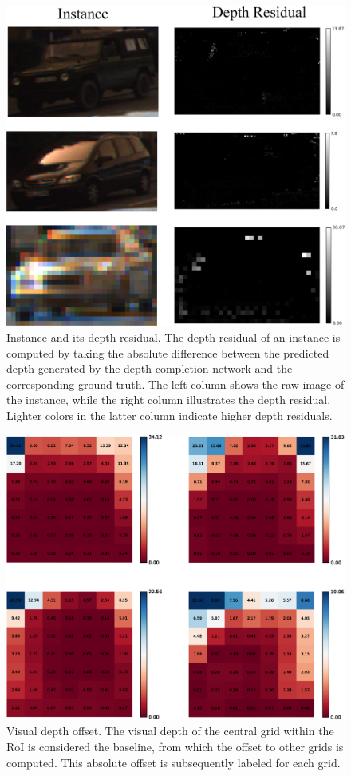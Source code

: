 \documentclass[journal]{IEEEtran}
\begin{document}
	\begin{figure}[!t]
	\centering
	\includegraphics[width=1.0\linewidth]{Figures/depth_residual}
	\caption{Instance and its depth residual. The depth residual of an instance is computed by taking the absolute difference between the predicted depth generated by the depth completion network and the corresponding ground truth. The left column shows the raw image of the instance, while the right column illustrates the depth residual. Lighter colors in the latter column indicate higher depth residuals.}
	\label{fig:depth_residual}
\end{figure}
	\begin{figure}[!t]
		\centering
		\includegraphics[width=1.0\linewidth]{Figures/visual_depth_offset/visual_depth_offset.eps}
		\caption{Visual depth offset. The visual depth of the central grid within the RoI is considered the baseline, from which the offset to other grids is computed. This absolute offset is subsequently labeled for each grid.}
		\label{fig:visual_depth_offset}
	\end{figure}
\end{document}
